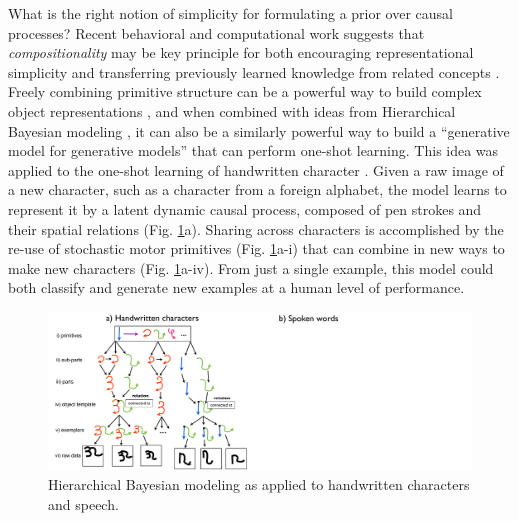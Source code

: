 \documentclass[10pt,letterpaper]{article}
\begin{document}
What is the right notion of simplicity for formulating a prior over causal processes? Recent behavioral and computational work suggests that \emph{compositionality} may be key principle for both encouraging representational simplicity and transferring previously learned knowledge from related concepts \cite{Lake2012,Lake2013}. Freely combining primitive structure can be a powerful way to build complex object representations \cite{Biederman1987}, and when combined with ideas from Hierarchical Bayesian modeling \cite{Gelman2004}, it can also be a similarly powerful way to build a ``generative model for generative models'' that can perform one-shot learning. This idea was applied to the one-shot learning of handwritten character \cite{Lake2013}. Given a raw image of a new character, such as a character from a foreign alphabet, the model learns to represent it by a latent dynamic causal process, composed of pen strokes and their spatial relations (Fig. \ref{models}a). Sharing across characters is accomplished by the re-use of stochastic motor primitives (Fig. \ref{models}a-i) that can combine in new ways to make new characters (Fig. \ref{models}a-iv). From just a single example, this model could both classify and generate new  examples at a human level of performance.

\begin{figure}[t]
\centering
\includegraphics[width=7in]{model.pdf}
\caption{Hierarchical Bayesian modeling as applied to handwritten characters and speech.}
\label{models}
\end{figure}
\end{document}
